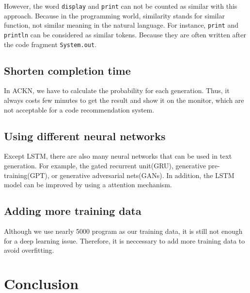 \documentclass[PRO,english]{ipsj}
\begin{document}
However, the word \texttt{display} and \texttt{print} can not be counted as similar with this approach. Because in the programming world, similarity stands for similar function, not similar meaning in the natural language. For instance, \texttt{print} and \texttt{println} can be considered as similar tokens. Because they are often written after the code fragment \texttt{System.out}.

\subsection{Shorten completion time}

In ACKN, we have to calculate the probability for each generation. Thus, it always costs few minutes to get the result and show it on the monitor, which are not acceptable for a code recommendation system. 


\subsection{Using different neural networks}
Except LSTM, there are also many neural networks that can be used in text generation. For example, the gated recurrent unit(GRU), generative pre-training(GPT), or generative adversarial nets(GANs). In addition, the LSTM model can be improved by using a attention mechanism. 

\subsection{Adding more training data}
Although we use nearly 5000 program as our training data, it is still not enough for a deep learning issue. Therefore, it is neccessary to add more training data to avoid overfitting.



\section{Conclusion}
\end{document}
